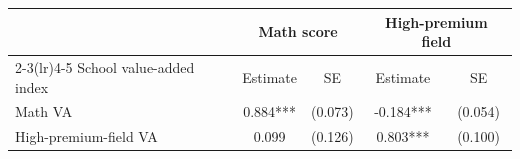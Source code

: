 \begin{tabular}{lcccc}
\toprule
& \multicolumn{2}{c}{Math score} & \multicolumn{2}{c}{High-premium field} \\
\cmidrule(lr){2-3}\cmidrule(lr){4-5}
School value-added index & Estimate & SE & Estimate & SE \\
\midrule
Math VA & 0.884*** & (0.073) & -0.184*** & (0.054) \\
High-premium-field VA & 0.099 & (0.126) & 0.803*** & (0.100) \\
\bottomrule
\end{tabular}
